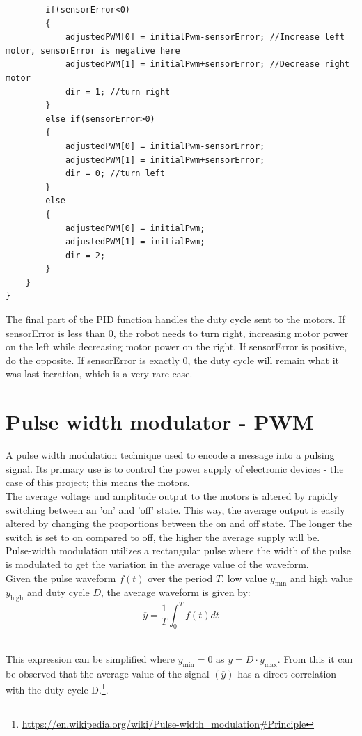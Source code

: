 \begin{lstlisting}
		if(sensorError<0)
		{
			adjustedPWM[0] = initialPwm-sensorError; //Increase left motor, sensorError is negative here
			adjustedPWM[1] = initialPwm+sensorError; //Decrease right motor
			dir = 1; //turn right
		}
		else if(sensorError>0)
		{
			adjustedPWM[0] = initialPwm-sensorError;
			adjustedPWM[1] = initialPwm+sensorError; 
			dir = 0; //turn left
		}
		else
		{
			adjustedPWM[0] = initialPwm;
			adjustedPWM[1] = initialPwm;
			dir = 2;
		}
	}
}
\end{lstlisting}
The final part of the PID function handles the duty cycle sent to the motors. If sensorError is less than 0, the robot needs to turn right, increasing motor power on the left while decreasing motor power on the right. If sensorError is positive, do the opposite. If sensorError is exactly 0, the duty cycle will remain what it was last iteration, which is a very rare case.

\section{Pulse width modulator - PWM}

A pulse width modulation technique used to encode a message into a pulsing signal. Its primary use is to control the power supply of electronic devices - the case of this project; this means the motors.\\
The average voltage and amplitude output to the motors is altered by rapidly switching between an 'on' and 'off' state. This way, the average output is easily altered by changing the proportions between the on and off state. The longer the switch is set to on compared to off, the higher the average supply will be.\\
Pulse-width modulation utilizes a rectangular pulse where the width of the pulse is modulated to get the variation in the average value of the waveform.\\ Given the pulse waveform $f(t)$ over the period $T$, low value $y_\mathrm{min}$ and high value $y_\mathrm{high}$ and duty cycle $D$, the average waveform is given by: \\

$$\overline{y}=\frac{1}{T}\int_{0}^{T}f(t)dt$$\

This expression can be simplified where $y_\mathrm{min}=0$ as $\overline{y}=D \cdot y_\mathrm{max}$. From this it can be observed that the average value of the signal $(\overline{y})$ has a direct correlation with the duty cycle D.\footnote{\url{https://en.wikipedia.org/wiki/Pulse-width_modulation\#Principle}}.
 
